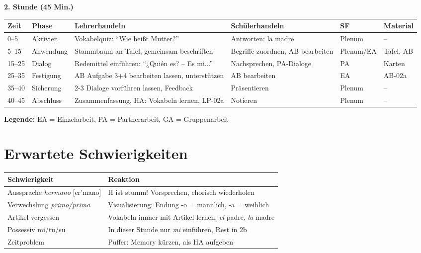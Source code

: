 \documentclass[11pt,a4paper]{article}
\begin{document}
\vspace{1em}

\textbf{2. Stunde (45 Min.)}

\begin{longtable}{|p{1cm}|p{1.5cm}|p{4cm}|p{3cm}|p{1.5cm}|p{2cm}|}
\hline
\textbf{Zeit} & \textbf{Phase} & \textbf{Lehrerhandeln} & \textbf{Schülerhandeln} & \textbf{SF} & \textbf{Material} \\
\hline
\endhead

0--5 & Aktivier. & Vokabelquiz: ``Wie heißt Mutter?'' & Antworten: la madre & Plenum & -- \\
\hline

5--15 & Anwendung & Stammbaum an Tafel, gemeinsam beschriften & Begriffe zuordnen, AB bearbeiten & Plenum/EA & Tafel, AB \\
\hline

15--25 & Dialog & Redemittel einführen: ``¿Quién es? -- Es mi...'' & Nachsprechen, PA-Dialoge & PA & Karten \\
\hline

25--35 & Festigung & AB Aufgabe 3+4 bearbeiten lassen, unterstützen & AB bearbeiten & EA & AB-02a \\
\hline

35--40 & Sicherung & 2-3 Dialoge vorführen lassen, Feedback & Präsentieren & Plenum & -- \\
\hline

40--45 & Abschluss & Zusammenfassung, HA: Vokabeln lernen, LP-02a & Notieren & Plenum & -- \\
\hline
\end{longtable}

\textbf{Legende:} EA = Einzelarbeit, PA = Partnerarbeit, GA = Gruppenarbeit

\section{Erwartete Schwierigkeiten}

\begin{tabular}{|p{4.5cm}|p{8cm}|}
\hline
\textbf{Schwierigkeit} & \textbf{Reaktion} \\
\hline
Aussprache \textit{hermano} [er'mano] & H ist stumm! Vorsprechen, chorisch wiederholen \\
\hline
Verwechslung \textit{primo/prima} & Visualisierung: Endung -o = männlich, -a = weiblich \\
\hline
Artikel vergessen & Vokabeln immer mit Artikel lernen: \textit{el} padre, \textit{la} madre \\
\hline
Possessiv mi/tu/su & In dieser Stunde nur \textit{mi} einführen, Rest in 2b \\
\hline
Zeitproblem & Puffer: Memory kürzen, als HA aufgeben \\
\hline
\end{tabular}
\end{document}
